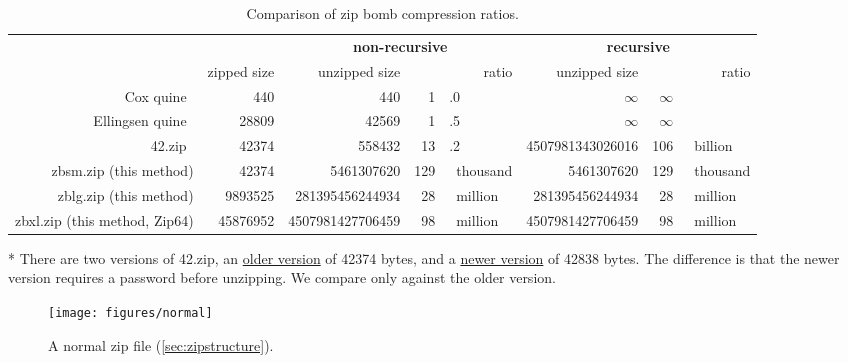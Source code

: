 \documentclass[letterpaper,twocolumn,10pt]{article}
\begin{document}
\begin{table*}
\centering
\begin{threeparttable}
\setlength{\tabcolsep}{0.45em}
\begin{tabular}{rr|rr@{}l|rr@{}l}
&
&
\multicolumn{3}{c|}{\textbf{non-recursive}} &
\multicolumn{3}{c}{\textbf{recursive}}
\\
&
zipped size &
unzipped size &
\multicolumn{2}{r|}{ratio\phantom{~thousand}} &
unzipped size &
\multicolumn{2}{r}{ratio\phantom{~thousand}}
\\
Cox quine~\cite{cox} &
\num{440} &
\num{440} &
\num{1}&.0 &
$\infty$ &
$\infty$&
\\
Ellingsen quine~\cite{ellingsen} &
\num{28809} &
\num{42569} &
\num{1}&.5 &
$\infty$ &
$\infty$&
\\
42.zip~\cite{42.zip} &
\num{42374}\tnote{*} &
\num{558432} &
\num{13}&.2 &
\num{4507981343026016} &
106&~billion
\\
zbsm.zip (this method) &
\num{42374} &
\num{5461307620} &
129&~thousand &
\num{5461307620} &
129&~thousand
\\
zblg.zip (this method) &
\num{9893525} &
\num{281395456244934} &
28&~million &
\num{281395456244934} &
28&~million
\\
zbxl.zip (this method, Zip64)&
\num{45876952} &
\num{4507981427706459} &
98&~million &
\num{4507981427706459} &
98&~million
\end{tabular}
\caption{
Comparison of zip bomb compression ratios.
}
\label{tab:comparison}
\begin{tablenotes}
\item [*]
There are two versions of 42.zip,
an \href{https://web.archive.org/web/20120222083624/http://www.unforgettable.dk/}{older version} of \num{42374} bytes,
and a \href{https://web.archive.org/web/20120301154142/http://www.unforgettable.dk/}{newer version} of \num{42838} bytes.
The difference is that the newer version requires a password before unzipping.
We compare only against the older version.
\end{tablenotes}
\end{threeparttable}
\end{table*}

\begin{figure*}
\texttt{[image: figures/normal]}
\caption{
A normal zip file
(\autoref{sec:zipstructure}).
}
\label{fig:normal}
\end{figure*}
\end{document}
